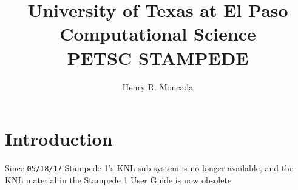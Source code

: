 \documentclass{article}
\begin{document}

\title{ University of Texas at El Paso\\
Computational Science\\
PETSC STAMPEDE}
\author{Henry R. Moncada}
\maketitle
\tableofcontents        %


\section{Introduction}
Since \verb+05/18/17+ Stampede 1's KNL sub-system is no longer available, and the KNL material in the Stampede 1 User Guide is now obsolete
\end{document}
